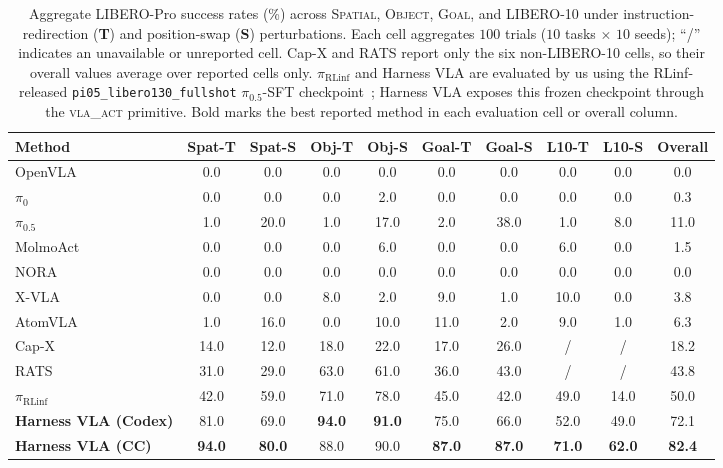 \documentclass[11pt]{article}
\newcommand{\piRLinf}{\pi_{\mathrm{RLinf}}}
\begin{document}
\begin{table}[htbp]
\centering
\caption{Aggregate LIBERO-Pro success rates (\%) across \textsc{Spatial}, \textsc{Object}, \textsc{Goal}, and \textsc{LIBERO-10} under instruction-redirection (\textbf{T}) and position-swap (\textbf{S}) perturbations. Each cell aggregates $100$ trials ($10$ tasks $\times$ $10$ seeds); ``/'' indicates an unavailable or unreported cell. Cap-X and RATS report only the six non-\textsc{LIBERO-10} cells, so their overall values average over reported cells only. $\piRLinf$ and Harness VLA are evaluated by us using the RLinf-released \texttt{pi05\_libero130\_fullshot} $\pi_{0.5}$-SFT checkpoint~\citep{yu2025rlinf}; Harness VLA exposes this frozen checkpoint through the \textsc{vla\_act} primitive. Bold marks the best reported method in each evaluation cell or overall column.}
\label{tab:libero_pro_perturbation}
\small
\setlength{\tabcolsep}{4pt}
\begin{tabular}{l cccccccc c}
\toprule
Method & Spat-T & Spat-S & Obj-T & Obj-S & Goal-T & Goal-S & L10-T & L10-S & \textbf{Overall} \\
\midrule
OpenVLA~\citep{kim2024openvla}           & 0.0 & 0.0 & 0.0 & 0.0 & 0.0 & 0.0 & 0.0 & 0.0 & 0.0 \\
$\pi_0$~\citep{black2025pi0}             & 0.0 & 0.0 & 0.0 & 2.0 & 0.0 & 0.0 & 0.0 & 0.0 & 0.3 \\
$\pi_{0.5}$~\citep{black2025pi05}        & 1.0 & 20.0 & 1.0 & 17.0 & 2.0 & 38.0 & 1.0 & 8.0 & 11.0 \\
MolmoAct~\citep{molmoact2025}            & 0.0 & 0.0 & 0.0 & 6.0 & 0.0 & 0.0 & 6.0 & 0.0 & 1.5 \\
NORA~\citep{hung2025nora}                & 0.0 & 0.0 & 0.0 & 0.0 & 0.0 & 0.0 & 0.0 & 0.0 & 0.0 \\
X-VLA~\citep{zheng2025xvla}              & 0.0 & 0.0 & 8.0 & 2.0 & 9.0 & 1.0 & 10.0 & 0.0 & 3.8 \\
AtomVLA~\citep{sun2026atomvla}           & 1.0 & 16.0 & 0.0 & 10.0 & 11.0 & 2.0 & 9.0 & 1.0 & 6.3 \\
\midrule
Cap-X~\citep{fu2026cap}                  & 14.0 & 12.0 & 18.0 & 22.0 & 17.0 & 26.0 &  / &  / & 18.2 \\
RATS~\citep{zhang2026playful}            & 31.0 & 29.0 & 63.0 & 61.0 & 36.0 & 43.0 &  / &  / & 43.8 \\
\midrule
$\piRLinf$                               & 42.0 & 59.0 & 71.0 & 78.0 & 45.0 & 42.0 & 49.0 & 14.0 & 50.0 \\
\textbf{Harness VLA (Codex)}             & 81.0 & 69.0 & \textbf{94.0} & \textbf{91.0} & 75.0 & 66.0 & 52.0 & 49.0 & 72.1 \\
\textbf{Harness VLA (CC)}                & \textbf{94.0} & \textbf{80.0} & 88.0 & 90.0 & \textbf{87.0} & \textbf{87.0} & \textbf{71.0} & \textbf{62.0} & \textbf{82.4} \\
\bottomrule
\end{tabular}
\end{table}
\end{document}
